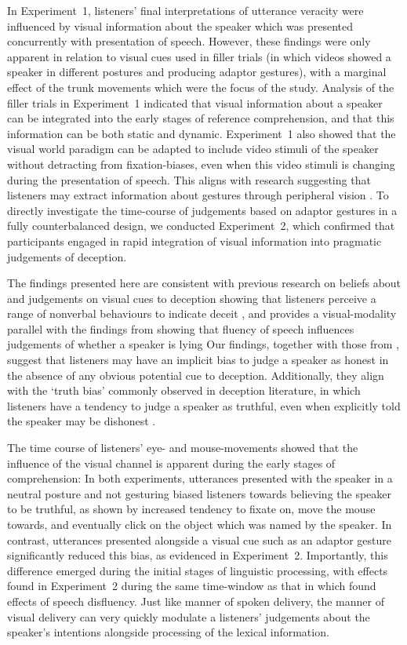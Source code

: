 \documentclass[a4paper,man,natbib]{apa6}
\begin{document}
In Experiment~1, listeners' final interpretations of utterance veracity were influenced by visual information about the speaker which was presented concurrently with presentation of speech.
However, these findings were only apparent in relation to visual cues used in filler trials (in which videos showed a speaker in different postures and producing adaptor gestures), with a marginal effect of the trunk movements which were the focus of the study.
Analysis of the filler trials in Experiment~1 indicated that visual information about a speaker can be integrated into the early stages of reference comprehension, and that this information can be both static and dynamic.
Experiment~1 also showed that the visual world paradigm can be adapted to include video stimuli of the speaker without detracting from fixation-biases, even when this video stimuli is changing during the presentation of speech.
This aligns with research suggesting that listeners may extract information about gestures through peripheral vision \citep[See e.g.][]{Gullberg2006}.
To directly investigate the time-course of judgements based on adaptor gestures in a fully counterbalanced design, we conducted Experiment~2, which confirmed that participants engaged in rapid integration of visual information into pragmatic judgements of deception.

The findings presented here are consistent with previous research on beliefs about and judgements on visual cues to deception showing that listeners perceive a range of nonverbal behaviours to indicate deceit \citep[e.g.][]{Zuckerman1981, Akehurst1996, Vrij2000}, and provides a visual-modality parallel with the findings from \citet{Loy2017} showing that fluency of speech influences judgements of whether a speaker is lying
Our findings, together with those from \citet{Loy2017}, suggest that listeners may have an implicit bias to judge a speaker as honest in the absence of any obvious potential cue to deception. 
Additionally, they align with the `truth bias' commonly observed in deception literature, in which listeners have a tendency to judge a speaker as truthful, even when explicitly told the speaker may be dishonest \citep{Vrij2000}.

The time course of listeners' eye- and mouse-movements showed that the influence of the visual channel is apparent during the early stages of comprehension:
In both experiments, utterances presented with the speaker in a neutral posture and not gesturing biased listeners towards believing the speaker to be truthful, as shown by increased tendency to fixate on, move the mouse towards, and eventually click on the object which was named by the speaker. 
In contrast, utterances presented alongside a visual cue such as an adaptor gesture significantly reduced this bias, as evidenced in Experiment~2.
Importantly, this difference emerged during the initial stages of linguistic processing, with effects found in Experiment~2 during the same time-window as that in which \citet{Loy2017} found effects of speech disfluency.
Just like manner of spoken delivery, the manner of visual delivery can very quickly modulate a listeners' judgements about the speaker's intentions alongside processing of the lexical information. 
\end{document}
